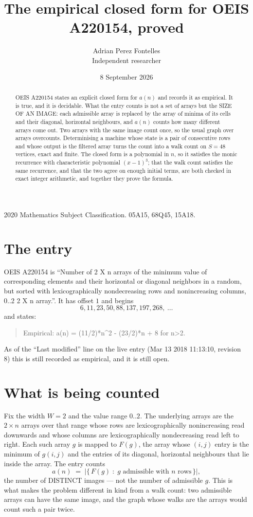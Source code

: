 \documentclass[11pt,a4paper]{article}
\title{The empirical closed form for OEIS A220154, proved}
\author{Adrian Perez Fontelles\\ \small Independent researcher}
\date{8 September 2026}
\theoremstyle{plain}
\theoremstyle{definition}
\begin{document}
\maketitle

\begin{abstract}
OEIS A220154 states an explicit closed form for $a(n)$ and records it as empirical. It is true, and
it is decidable. What the entry counts is not a set of arrays but the SIZE OF AN IMAGE: each
admissible array is replaced by the array of minima of its cells and their diagonal, horizontal neighbours,
and $a(n)$ counts how many different arrays come out. Two arrays with the same image count
once, so the usual graph over arrays overcounts. Determinising a machine whose state is a pair
of consecutive rows and whose output is the filtered array turns the count into a walk count on
$S=48$ vertices, exact and finite. The closed form is a polynomial in $n$, so it satisfies the
monic recurrence with characteristic polynomial $(x-1)^{3}$; that the walk count
satisfies the same recurrence, and that the two agree on enough initial terms, are both checked
in exact integer arithmetic, and together they prove the formula.
\end{abstract}

\noindent\small 2020 Mathematics Subject Classification. 05A15, 68Q45, 15A18.\normalsize

\section{The entry}

OEIS A220154 is ``Number of 2 X n arrays of the minimum value of corresponding elements and their horizontal or diagonal neighbors in a random, but sorted with lexicographically nondecreasing rows and nonincreasing columns, 0..2 2 X n array.''. It has offset $1$ and begins
\[
6, 11, 23, 50, 88, 137, 197, 268,\ \dots
\]
and states:
\begin{quote}
Empirical: a(n) = (11/2)*n\^{}2 - (23/2)*n + 8 for n>2.
\end{quote}
As of the ``Last modified'' line on the live entry (Mar 13 2018 11:13:10, revision 8)
this is still recorded as empirical, and it is still open.

\section{What is being counted}

Fix the width $W=2$ and the value range $0..2$. The underlying arrays are the
$2\times n$ arrays over that range whose rows are lexicographically nonincreasing read downwards
and whose columns are lexicographically nondecreasing read left to right. Each such array $g$
is mapped to $F(g)$, the array whose $(i,j)$ entry is the minimum of $g(i,j)$ and the entries
of its diagonal, horizontal neighbours that lie inside the array. The entry counts
\[
a(n)\;=\;\bigl|\{\,F(g)\;:\;g\text{ admissible with }n\text{ rows}\,\}\bigr|,
\]
the number of DISTINCT images --- not the number of admissible $g$. This is what makes the
problem different in kind from a walk count: two admissible arrays can have the same image, and
the graph whose walks are the arrays would count such a pair twice.
\end{document}

